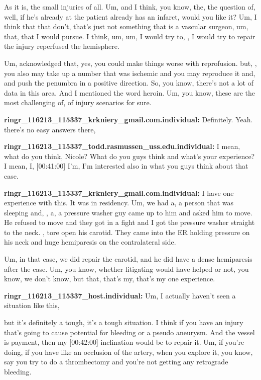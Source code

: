 \documentclass[
]{book}
\begin{document}
As it is, the small injuries of all. Um, and I think, you know, the, the
question of, well, if he's already at the patient already has an
infarct, would you like it? Um, I think that that don't, that's just not
something that is a vascular surgeon, um, that, that I would pursue. I
think, um, um, I would try to, , I would try to repair the injury
reperfused the hemisphere.

Um, acknowledged that, yes, you could make things worse with
reprofusion. but, , you also may take up a number that was ischemic and
you may reproduce it and, and push the penumbra in a positive direction.
So, you know, there's not a lot of data in this area. And I mentioned
the word heroin. Um, you know, these are the most challenging of, of
injury scenarios for sure.

\textbf{ringr\_116213\_115337\_krkniery\_gmail.com.individual:} Definitely. Yeah.
there's no easy answers there,

\textbf{ringr\_116213\_115337\_todd.rasmussen\_uss.edu.individual:} I mean, what
do you think, Nicole? What do you guys think and what's your experience?
I mean, I, {[}00:41:00{]} I'm, I'm interested also in what you guys think
about that case.

\textbf{ringr\_116213\_115337\_krkniery\_gmail.com.individual:} I have one
experience with this. It was in residency. Um, we had a, a person that
was sleeping and, , a, a pressure washer guy came up to him and asked
him to move. He refused to move and they got in a fight and I got the
pressure washer straight to the neck. , tore open his carotid. They came
into the ER holding pressure on his neck and huge hemiparesis on the
contralateral side.

Um, in that case, we did repair the carotid, and he did have a dense
hemiparesis after the case. Um, you know, whether litigating would have
helped or not, you know, we don't know, but that, that's my, that's my
one experience.

\textbf{ringr\_116213\_115337\_host.individual:} Um, I actually haven't seen a
situation like this,

but it's definitely a tough, it's a tough situation. I think if you have
an injury that's going to cause potential for bleeding or a pseudo
aneurysm. And the vessel is payment, then my {[}00:42:00{]} inclination
would be to repair it. Um, if you're doing, if you have like an
occlusion of the artery, when you explore it, you know, say you try to
do a thrombectomy and you're not getting any retrograde bleeding.
\end{document}
